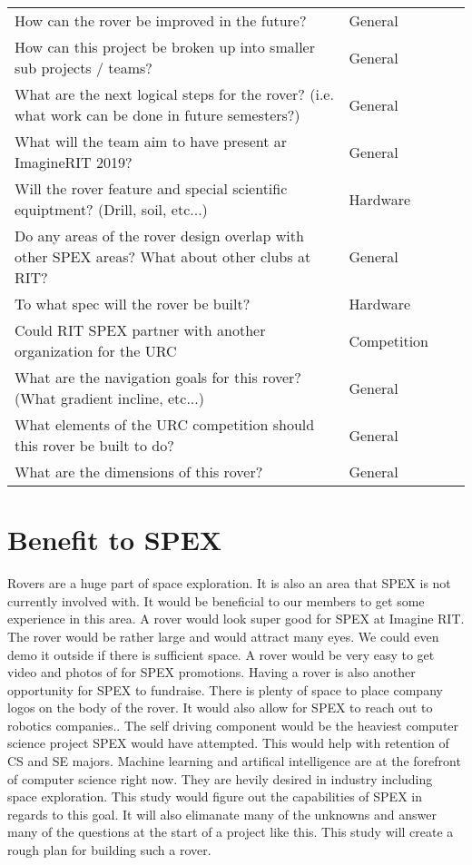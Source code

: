 \documentclass[conference]{IEEEtran} %
\begin{document}
\begin{table*}
\begin{tabular}{@{}llcc@{}}
        How can the rover be improved in the future? & General \\
        How can this project be broken up into smaller sub projects / teams? & General \\
        What are the next logical steps for the rover? (i.e. what work can be done in future semesters?) & General \\
        What will the team aim to have present ar ImagineRIT 2019? & General \\ 
        Will the rover feature and special scientific equiptment? (Drill, soil, etc...) & Hardware \\
        Do any areas of the rover design overlap with other SPEX areas? What about other clubs at RIT? & General \\
        To what spec will the rover be built? & Hardware \\
        Could RIT SPEX partner with another organization for the URC & Competition \\
        What are the navigation goals for this rover? (What gradient incline, etc...) & General \\
        What elements of the URC competition should this rover be built to do? & General \\
        What are the dimensions of this rover? & General \\
        \bottomrule
    \end{tabular}
\label{tab:questions}
\end{table*}

\section{Benefit to SPEX}
\label{sec:benefit}

Rovers are a huge part of space exploration. It is also an area that SPEX is not currently involved with. It would be beneficial to our members to get some experience in this area.
A rover would look super good for SPEX at Imagine RIT. The rover would be rather large and would attract many eyes. We could even demo it outside if there is sufficient space. 
A rover would be very easy to get video and photos of for SPEX promotions. 
Having a rover is also another opportunity for SPEX to fundraise. There is plenty of space to place company logos on the body of the rover. It would also allow for SPEX to reach out to robotics companies.. 
The self driving component would be the heaviest computer science project SPEX would have attempted. This would help with retention of CS and SE majors. 
Machine learning and artifical intelligence are at the forefront of computer science right now. They are hevily desired in industry including space exploration.
This study would figure out the capabilities of SPEX in regards to this goal. It will also elimanate many of the unknowns and answer many of the questions at the start of a project like this. This study will create a rough plan for building such a rover.
\end{document}
